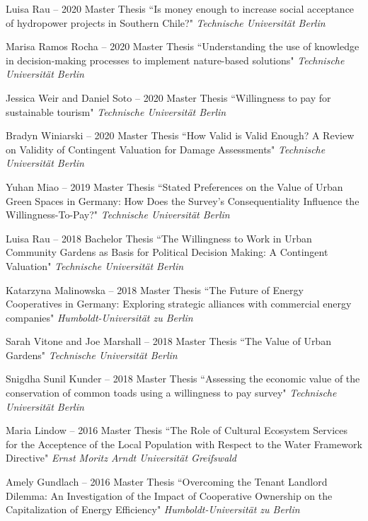 \documentclass[paper=a4,fontsize=11pt]{scrartcl} %
\newcommand{\ThesisEntry}[5]{
		\noindent #1 -- #2 #3 ``#4" \textit{#5}}
\begin{document}
\begin{etaremune}
\item \ThesisEntry{Luisa Rau}{2020}{Master Thesis}{Is money enough to increase social acceptance of hydropower projects in Southern Chile?}{Technische Universität Berlin}

\item \ThesisEntry{Marisa Ramos Rocha}{2020}{Master Thesis}{Understanding the use of knowledge in decision-making processes to implement nature-based solutions}{Technische Universität Berlin}

\item \ThesisEntry{Jessica Weir and Daniel Soto}{2020}{Master Thesis}{Willingness to pay for sustainable tourism}{Technische Universität Berlin}

\item \ThesisEntry{Bradyn Winiarski}{2020}{Master Thesis}{How Valid is Valid Enough? A Review on Validity of Contingent Valuation for Damage Assessments}{Technische Universität Berlin}

\item \ThesisEntry{Yuhan Miao}{2019}{Master Thesis}{Stated Preferences on the Value of Urban Green Spaces in Germany: How Does the Survey's Consequentiality Influence the Willingness-To-Pay?}{Technische Universität Berlin}

\item \ThesisEntry{Luisa Rau}{2018}{Bachelor Thesis}{The Willingness to Work in Urban Community Gardens as Basis for Political Decision Making: A Contingent Valuation}{Technische Universität Berlin}

\item \ThesisEntry{Katarzyna Malinowska}{2018}{Master Thesis}{The Future of Energy Cooperatives in Germany: Exploring strategic alliances with commercial energy companies}{Humboldt-Universität zu Berlin}

\item \ThesisEntry{Sarah Vitone and Joe Marshall}{2018}{Master Thesis}{The Value of Urban Gardens}{Technische Universität Berlin}

\item \ThesisEntry{Snigdha Sunil Kunder}{2018}{Master Thesis}{Assessing the economic value of the conservation of common toads using a willingness to pay survey}{Technische Universität Berlin}

\item \ThesisEntry{Maria Lindow}{2016}{Master Thesis}{The Role of Cultural Ecosystem Services for the Acceptence of the Local Population with Respect to the Water Framework Directive}{Ernst Moritz Arndt Universität Greifswald}

\item \ThesisEntry{Amely Gundlach}{2016}{Master Thesis}{Overcoming the Tenant Landlord Dilemma:
An Investigation of the Impact of Cooperative Ownership on the Capitalization of Energy Efficiency}{Humboldt-Universität zu Berlin}


\end{etaremune}
\end{document}
